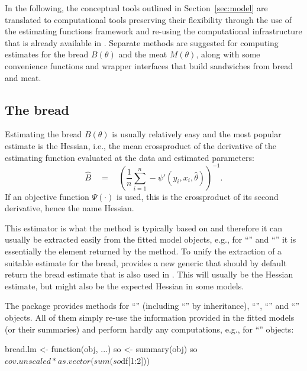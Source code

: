 \documentclass{Z}
\begin{document}
In the following, the conceptual tools outlined in Section~\ref{sec:model} are translated
to computational tools preserving their flexibility through the use of the estimating 
functions framework and re-using the computational infrastructure that is already available
in . Separate methods are suggested for computing estimates for the bread
$B(\theta)$ and the meat $M(\theta)$, along with some convenience functions and wrapper
interfaces that build sandwiches from bread and meat.

\subsection{The bread}

Estimating the bread $B(\theta)$ is usually relatively easy and the most popular estimate
is the Hessian, i.e., the mean crossproduct of the derivative of the estimating function
evaluated at the data and estimated parameters:
\begin{equation} \label{eq:Bhat}
  \hat B \quad = \quad \left( \frac{1}{n} \sum_{i = 1}^n - \psi'(y_i, x_i, \hat \theta) \right)^{-1}.
\end{equation}
If an objective function $\Psi(\cdot)$ is used, this is the crossproduct of its
second derivative, hence the name Hessian.

This estimator is what the  method is typically based on and therefore it can
usually be extracted easily from the fitted model objects, e.g., for ``'' and
``'' it is essentially the  element returned by the 
 method. To unify the extraction of a suitable estimate for the bread,
 provides a new  generic that should by default return
the bread estimate that is also used in . This will usually be the Hessian
estimate, but might also be the expected Hessian \citep[Equation~5.36]{hac:Cameron+Trivedi:2005}
in some models.

The package  provides  methods for ``'' (including ``''
by inheritance), ``'', ``'' and ``'' objects. All of them
simply re-use the information provided in the fitted models (or their summaries) and
perform hardly any computations, e.g., for ``'' objects:
\begin{Schunk}
\begin{Sinput}
bread.lm <- function(obj, ...)
{
  so <- summary(obj)
  so$cov.unscaled * as.vector(sum(so$df[1:2]))
}
\end{Sinput}
\end{Schunk}
\end{document}
